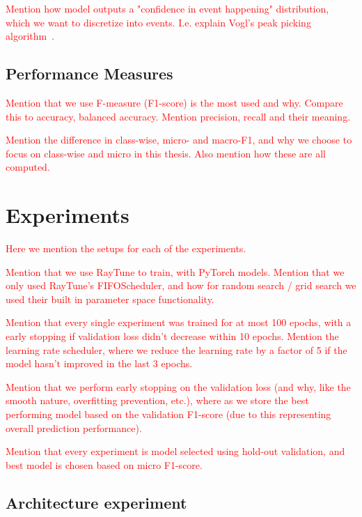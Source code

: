 \textcolor{red}{Mention how model outputs a "confidence in event happening" distribution, which we want to discretize into events.
I.e. explain Vogl's peak picking algorithm~\cite{vogl2018multiinstrumentdrumtranscription}.}

\subsection{Performance Measures}

\textcolor{red}{Mention that we use F-measure (F1-score) is the most used and why. Compare this to accuracy, balanced accuracy. Mention precision, recall and their meaning.}

\textcolor{red}{Mention the difference in class-wise, micro- and macro-F1, and why we choose to focus on class-wise and micro in this thesis.
Also mention how these are all computed.}

\section{Experiments}

\textcolor{red}{Here we mention the setups for each of the experiments.}

\textcolor{red}{Mention that we use RayTune to train, with PyTorch models. Mention that we only used RayTune's FIFOScheduler, and how for random search / grid search we used their built in parameter space functionality.}

\textcolor{red}{Mention that every single experiment was trained for at most 100 epochs, with a early stopping if validation loss didn't decrease within 10 epochs.
Mention the learning rate scheduler, where we reduce the learning rate by a factor of 5 if the model hasn't improved in the last 3 epochs.}

\textcolor{red}{Mention that we perform early stopping on the validation loss (and why, like the smooth nature, overfitting prevention, etc.), where as we store the best performing model based on the validation F1-score (due to this representing overall prediction performance).}

\textcolor{red}{Mention that every experiment is model selected using hold-out validation, and best model is chosen based on micro F1-score.}


\subsection{Architecture experiment}

